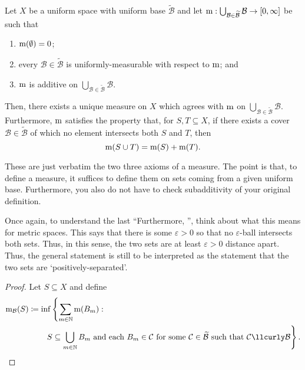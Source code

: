 \begin{thm}\label{CaratheodorysExtensionTheorem}
Let $X$ be a uniform space with uniform base $\widetilde{\mathcal{B}}$ and let $\mathrm{m} :\bigcup _{\mathcal{B}\in \widetilde{\mathcal{B}}}\mathcal{B}\rightarrow [0,\infty ]$ be such that
\begin{enumerate}
\item $\mathrm{m} (\emptyset )=0$;
\item every $\mathcal{B}\in \widetilde{\mathcal{B}}$ is uniformly-measurable with respect to $\mathrm{m}$; and
\item $\mathrm{m}$ is additive on $\bigcup _{\mathcal{B}\in \widetilde{\mathcal{B}}}\mathcal{B}$.
\end{enumerate}
Then, there exists a unique measure on $X$ which agrees with $\mathrm{m}$ on $\bigcup _{\mathcal{B}\in \widetilde{\mathcal{B}}}\mathcal{B}$.  Furthermore, $\mathrm{m}$ satisfies the property that, for $S,T\subseteq X$, if there exists a cover $\mathcal{B}\in \widetilde{\mathcal{B}}$ of which no element intersects both $S$ and $T$, then
\begin{equation}
\mathrm{m} (S\cup T)=\mathrm{m} (S)+\mathrm{m} (T).
\end{equation}
\begin{rmk}
These are just verbatim the two three axioms of a measure.  The point is that, to define a measure, it suffices to define them on sets coming from a given uniform base.  Furthermore, you also do not have to check subadditivity of your original definition.
\end{rmk}
\begin{rmk}
Once again, to understand the last ``Furthermore, \textellipsis'', think about what this means for metric spaces.  This says that there is some $\varepsilon >0$ so that no $\varepsilon$-ball intersects both sets.  Thus, in this sense, the two sets are at least $\varepsilon >0$ distance apart.  Thus, the general statement is still to be interpreted as the statement that the two sets are `positively-separated'.
\end{rmk}
\begin{proof}
Let $S\subseteq X$ and define
\begin{equation}
\begin{split}
\meas _{\mathcal{B}}(S) & \coloneqq \inf \left\{ \sum _{m\in \N}\meas (B_m):\right. \\
& \qquad \left. S\subseteq \bigcup _{m\in \N}B_m\text{ and  each }B_m\in \mathcal{C}\text{ for some }\mathcal{C}\in \widetilde{\mathcal{B}}\text{ such that }\mathcal{C}\llcurly \mathcal{B}\right\} .
\end{split}
\end{equation}


\end{proof}
\end{thm}
